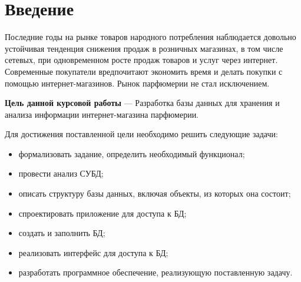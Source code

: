 \chapter*{Введение}
 
Последние годы на рынке товаров народного потребления наблюдается довольно устойчивая тенденция снижения продаж в розничных магазинах, в том числе сетевых, при одновременном росте продаж товаров и услуг через интернет. Современные покупатели вредпочитают экономить время и делать покупки с помощью интернет-магазинов. Рынок парфюмерии не стал исключением. 

\textbf{Цель данной курсовой работы} --- Разработка базы данных для хранения и анализа информации интернет-магазина парфюмерии.

Для достижения поставленной цели необходимо решить следующие задачи:
\begin{itemize}
	\item формализовать задание, определить необходимый функционал;
	\item провести анализ СУБД; 
	\item описать структуру базы данных, включая объекты, из которых она состоит;
	\item спроектировать приложение для доступа к БД;
	\item создать и заполнить БД;
	\item реализовать интерфейс для доступа к БД;
	\item разработать программное обеспечение, реализующую поставленную задачу.
\end{itemize}